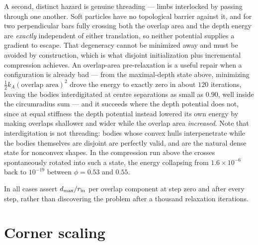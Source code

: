 \documentclass[11pt]{article}
\begin{document}
A second, distinct hazard is genuine threading --- limbs interlocked by passing through one another. Soft particles have no topological barrier against it, and for two perpendicular bars fully crossing both the overlap area and the depth energy are \emph{exactly} independent of either translation, so neither potential supplies a gradient to escape. That degeneracy cannot be minimized away and must be avoided by construction, which is what disjoint initialization plus incremental compression achieves. An overlap-area pre-relaxation is a useful repair when a configuration is already bad --- from the maximal-depth state above, minimizing $\tfrac12 k_A(\text{overlap area})^2$ drove the energy to exactly zero in about $120$ iterations, leaving the bodies interdigitated at centre separations as small as $0.90$, well inside the circumradius sum --- and it succeeds where the depth potential does not, since at equal stiffness the depth potential instead lowered its own energy by making overlaps shallower and wider while the overlap area \emph{increased}. Note that interdigitation is not threading: bodies whose convex hulls interpenetrate while the bodies themselves are disjoint are perfectly valid, and are the natural dense state for nonconvex shapes. In the compression run above the crosses spontaneously rotated into such a state, the energy collapsing from $1.6\times10^{-6}$ back to $10^{-19}$ between $\phi = 0.53$ and $0.55$.

In all cases assert $d_{\max}/r_{\rm in}$ per overlap component at step zero and after every step, rather than discovering the problem after a thousand relaxation iterations.

\section{Corner scaling}
\label{sec:corners}
\end{document}
